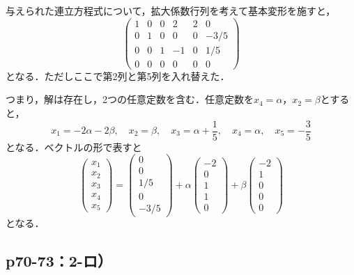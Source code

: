 \documentclass[uplatex,dvipdfmx,a4paper,11pt,fleqn]{jsarticle}
\begin{document}
\begin{tleftbar}
    与えられた連立方程式について，拡大係数行列を考えて基本変形を施すと，
    \[
        \begin{pmatrix} 1 & 0 & 0 & 2 & 2 & 0 \\ 0 & 1& 0 & 0 & 0 & -3/5 \\ 0 & 0 & 1 & -1 & 0 & 1/5 \\ 0 & 0 & 0 & 0 & 0 & 0 \end{pmatrix}
    \]
    となる．ただしここで第2列と第5列を入れ替えた．

    つまり，解は存在し，2つの任意定数を含む．任意定数を$x_4 = \alpha$，$x_2 = \beta $とすると，
    \[
        x_1 = -2 \alpha - 2 \beta , \quad x_2 =\beta , \quad x_3 = \alpha + \frac{1}{5} , \quad x_4 = \alpha , \quad x_5 = -\frac{3}{5}
    \]
    となる．ベクトルの形で表すと
    \[
        \begin{pmatrix} x_1 \\ x_2 \\ x_3 \\ x_4 \\ x_5 \end{pmatrix}= \begin{pmatrix} 0 \\ 0 \\ 1/5 \\ 0 \\ -3/5 \end{pmatrix} + \alpha \begin{pmatrix} -2 \\ 0 \\ 1 \\ 1 \\ 0 \end{pmatrix} + \beta \begin{pmatrix} -2 \\ 1 \\ 0 \\ 0 \\ 0 \end{pmatrix}
    \]
    となる．
\end{tleftbar}

\subsection*{p70-73：2-ロ）}
\end{document}
